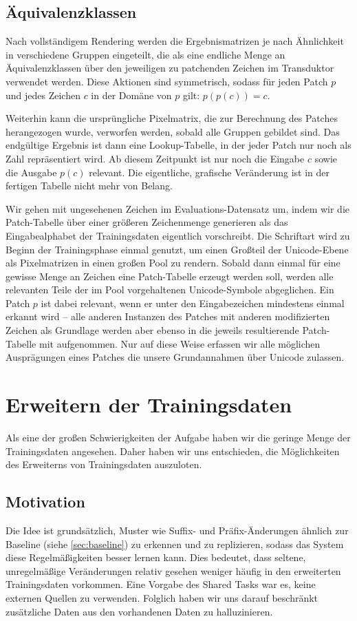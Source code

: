 \documentclass[11pt,a4paper]{article}
\begin{document}
\subsection{Äquivalenzklassen}
Nach vollständigem Rendering werden die Ergebnismatrizen je nach Ähnlichkeit in verschiedene Gruppen eingeteilt, die als eine endliche Menge an Äquivalenzklassen über den jeweiligen zu patchenden Zeichen im Transduktor verwendet werden. Diese Aktionen sind symmetrisch, sodass für jeden Patch $p$ und jedes Zeichen $c$ in der Domäne von $p$ gilt: $p(p(c)) = c$.

Weiterhin kann die ursprüngliche Pixelmatrix, die zur Berechnung des Patches herangezogen wurde, verworfen werden, sobald alle Gruppen gebildet sind. Das endgültige Ergebnis ist dann eine Lookup-Tabelle, in der jeder Patch nur noch als Zahl repräsentiert wird. Ab diesem Zeitpunkt ist nur noch die Eingabe $c$ sowie die Ausgabe $p(c)$ relevant. Die eigentliche, grafische Veränderung ist in der fertigen Tabelle nicht mehr von Belang.

Wir gehen mit ungesehenen Zeichen im Evaluations-Datensatz um, indem wir die Patch-Tabelle über einer größeren Zeichenmenge generieren als das Eingabealphabet der Trainingsdaten eigentlich vorschreibt. Die Schriftart wird zu Beginn der Trainingsphase einmal genutzt, um einen Großteil der Unicode-Ebene als Pixelmatrizen in einen großen Pool zu rendern. Sobald dann einmal für eine gewisse Menge an Zeichen eine Patch-Tabelle erzeugt werden soll, werden alle relevanten Teile der im Pool vorgehaltenen Unicode-Symbole abgeglichen. Ein Patch $p$ ist dabei relevant, wenn er unter den Eingabezeichen mindestens einmal erkannt wird -- alle anderen Instanzen des Patches mit anderen modifizierten Zeichen als Grundlage werden aber ebenso in die jeweils resultierende Patch-Tabelle mit aufgenommen. Nur auf diese Weise erfassen wir alle möglichen Ausprägungen eines Patches die unsere Grundannahmen über Unicode zulassen.

\section{Erweitern der Trainingsdaten}
\label{sec:enhancer}

Als eine der großen Schwierigkeiten der Aufgabe haben wir die geringe Menge der Trainingsdaten
angesehen. Daher haben wir uns entschieden, die Möglichkeiten des Erweiterns von Trainingsdaten auszuloten.

\subsection{Motivation}
Die Idee ist grundsätzlich, Muster wie Suffix- und Präfix-Änderungen ähnlich zur Baseline (siehe \autoref{sec:baseline}) zu erkennen und zu replizieren, sodass das System diese Regelmäßigkeiten besser lernen kann. Dies bedeutet, dass seltene, unregelmäßige Veränderungen relativ gesehen weniger häufig in den erweiterten Trainingsdaten vorkommen.
Eine Vorgabe des Shared Tasks war es, keine externen Quellen zu verwenden. Folglich haben wir uns darauf beschränkt zusätzliche Daten aus den vorhandenen Daten zu halluzinieren.
\end{document}
